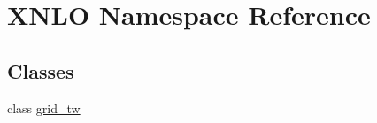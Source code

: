 \hypertarget{namespace_x_n_l_o}{}\section{X\+N\+LO Namespace Reference}
\label{namespace_x_n_l_o}
\subsection*{Classes}
\begin{DoxyCompactItemize}
\item 
class \hyperlink{class_x_n_l_o_1_1grid__tw}{grid\+\_\+tw}
\end{DoxyCompactItemize}

